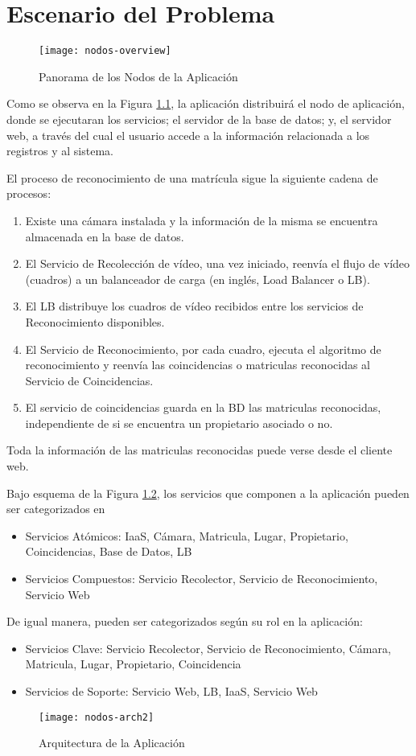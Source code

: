 \chapter{Escenario del Problema}
\begin{figure}[H]
\centering
\texttt{[image: nodos-overview]}
\caption{Panorama de los Nodos de la Aplicación}
\label{fig:nodos-overview}
\end{figure}
    
    Como se observa en la Figura \ref{fig:nodos-overview}, la aplicación distribuirá el nodo de aplicación, donde se ejecutaran los servicios; el servidor de la base de datos; y, el servidor web, a través del cual el usuario accede a la información relacionada a los registros y al sistema.
        
    El proceso de reconocimiento de una matrícula sigue la siguiente cadena de procesos:

        \begin{enumerate}
            \item Existe una cámara instalada y la información de la misma se encuentra almacenada en la base de datos.
            \item El Servicio de Recolección de vídeo, una vez iniciado, reenvía el flujo de vídeo (cuadros) a un balanceador de carga (en inglés, Load Balancer o LB).
            \item El LB distribuye los cuadros de vídeo recibidos entre los servicios de Reconocimiento disponibles.
            \item El Servicio de Reconocimiento, por cada cuadro, ejecuta el algoritmo de reconocimiento y reenvía las coincidencias o matriculas reconocidas al Servicio de Coincidencias.
            \item El servicio de coincidencias guarda en la BD las matriculas reconocidas, independiente de si se encuentra un propietario asociado o no.
        \end{enumerate}    
        
Toda la información de las matriculas reconocidas puede verse desde el cliente web.

Bajo esquema de la Figura \ref{fig:nodos-arch}, los servicios que componen a la aplicación pueden ser categorizados en

    \begin{itemize}
        \item Servicios Atómicos: IaaS, Cámara, Matricula, Lugar, Propietario, Coincidencias, Base de Datos, LB
        \item Servicios Compuestos: Servicio Recolector, Servicio de Reconocimiento, Servicio Web
    \end{itemize}
    De igual manera, pueden ser categorizados según su rol en la aplicación:
    \begin{itemize}
        \item Servicios Clave: Servicio Recolector, Servicio de Reconocimiento, Cámara, Matricula, Lugar, Propietario, Coincidencia
        \item Servicios de Soporte: Servicio Web, LB, IaaS, Servicio Web
    \end{itemize}

\begin{figure}[ht]
\centering
\texttt{[image: nodos-arch2]}
\caption{Arquitectura de la Aplicación}
\label{fig:nodos-arch}
\end{figure} 